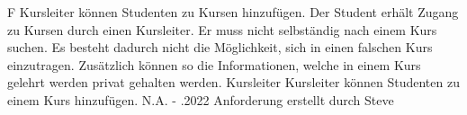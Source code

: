 \begin{myreq}
    \threeinline
    {\reqno }
    {\reqtype F}
    {}
    \reqdesc Kursleiter können Studenten zu Kursen hinzufügen.
    \reqrat Der Student erhält Zugang zu Kursen durch einen Kursleiter. Er muss nicht selbständig nach einem Kurs suchen. Es besteht dadurch nicht die Möglichkeit, sich in einen falschen Kurs einzutragen.
    Zusätzlich können so die Informationen, welche in einem Kurs gelehrt werden privat gehalten werden.
    \reqorig Kursleiter
    \reqfit Kursleiter können Studenten zu einem Kurs hinzufügen.
    \twoinline
    {}
    {}
    \twoinline
    {}
    {\reqconf N.A.}
    \reqmater -
    .2022 Anforderung erstellt durch Steve
\end{myreq}